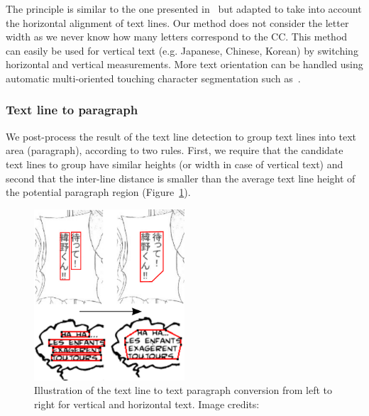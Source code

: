 The principle is similar to the one presented in~\cite{Clavelli09} but adapted to take into account the horizontal alignment of text lines.
Our method does not consider the letter width as we never know how many letters correspond to the CC.
This method can easily be used for vertical text (e.g. Japanese, Chinese, Korean) by switching horizontal and vertical measurements.
More text orientation can be handled using automatic multi-oriented touching character segmentation such as~\cite{Roy2009Multi}.








\subsubsection{Text line to paragraph} %
\label{par:text_line_grouping}

We post-process the result of the text line detection to group text lines into text area (paragraph), according to two rules.
First, we require that the candidate text lines to group have similar heights (or width in case of vertical text) and second that the inter-line distance is smaller than the average text line height of the potential paragraph region (Figure~\ref{fig:se:line_to_paragraphs}).

	\begin{figure}[h!]	%
	  \centering
		\includegraphics[trim= 0px 0px 0px 0px, clip, width=0.5\textwidth]{line_to_paragraphs.pdf}
		\caption[Text line to text paragraph conversion illustration]{Illustration of the text line to text paragraph conversion from left to right for vertical and horizontal text. Image credits:~\cite{Inoue08,Bubble09}}
		\label{fig:se:line_to_paragraphs}
	\end{figure}

